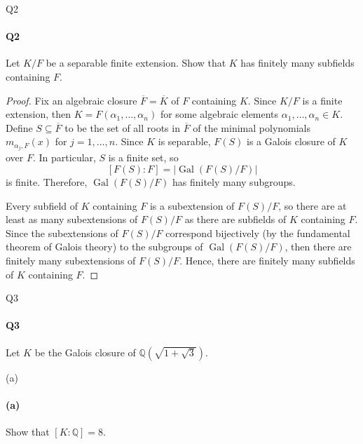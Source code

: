 \documentclass[12pt]{article}
\newenvironment{fullbox}{\begin{lrbox}{\savefullbox}\begin{minipage}{\dimexpr\textwidth-2\fboxsep\relax}}{\end{minipage}\end{lrbox}\begin{center}\framebox[\textwidth]{\usebox{\savefullbox}}\end{center}}
\newenvironment{pbox}[1][]{\begin{fullbox}\ifx#1\empty\else\paragraph{#1}\fi}{\end{fullbox}}
\theoremstyle{definition}
\newcommand{\Q}{\mathbb{Q}}
\newcommand{\<}{\langle}
\renewcommand{\>}{\rangle}
\newcommand{\clo}{\overline}
\DeclareMathOperator{\Gal}{Gal}
\begin{document}
\newpage
\begin{pbox}[Q2]
    Let $K/F$ be a separable finite extension. Show that $K$ has finitely many subfields containing $F$.
\end{pbox}

\begin{proof}
    Fix an algebraic closure $\clo{F} = \clo{K}$ of $F$ containing $K$. Since $K/F$ is a finite extension, then $K = F(\alpha_1, \dots, \alpha_n)$ for some algebraic elements $\alpha_1, \dots, \alpha_n \in K$. Define $S \subseteq \clo{F}$ to be the set of all roots in $\clo{F}$ of the minimal polynomials $m_{\alpha_j, F}(x)$ for $j = 1, \dots, n$. Since $K$ is separable, $F(S)$ is a Galois closure of $K$ over $F$. In particular, $S$ is a finite set, so
    \[
        [F(S) : F] = |\Gal(F(S)/F)|
    \]
    is finite. Therefore, $\Gal(F(S)/F)$ has finitely many subgroups.

    Every subfield of $K$ containing $F$ is a subextension of $F(S)/F$, so there are at least as many subextensions of $F(S)/F$ as there are subfields of $K$ containing $F$. Since the subextensions of $F(S)/F$ correspond bijectively (by the fundamental theorem of Galois theory) to the subgroups of $\Gal(F(S)/F)$, then there are finitely many subextensions of $F(S)/F$. Hence, there are finitely many subfields of $K$ containing $F$.

\end{proof}



\newpage
\begin{pbox}[Q3]
    Let $K$ be the Galois closure of $\Q(\sqrt{1 + \sqrt{3}})$.
\end{pbox}

\begin{pbox}[(a)]
    Show that $[K : \Q] = 8$.
\end{pbox}
\end{document}
